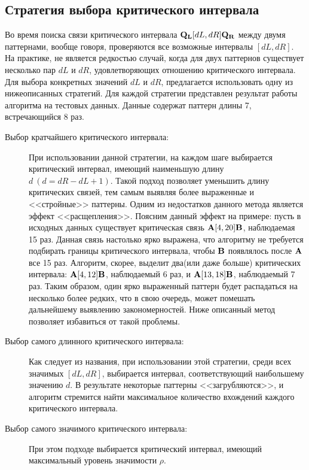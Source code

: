 \subsection{Стратегия выбора критического интервала}
Во время поиска связи критического интервала ${\bf Q_L}[dL,dR]{\bf Q_R}$  между двумя паттернами, вообще говоря, проверяются все возможные интервалы $[dL, dR]$.
На практике, не является редкостью случай, когда для двух паттернов существует несколько пар $dL$ и $dR$, удовлетворяющих отношению
критического интервала. Для выбора конкретных значений $dL$ и  $dR$, предлагается использовать одну из нижеописанных стратегий. Для каждой стратегии 
представлен результат работы алгоритма на тестовых данных. Данные содержат паттерн длины 7, встречающийся 8 раз. 
\begin{description}
\item[Выбор кратчайшего критического интервала:]

При использовании данной стратегии, на каждом шаге выбирается критический интервал, имеющий наименьшую длину $d~(d=dR-dL+1)$.
Такой подход позволяет уменьшить длину критических связей, тем самым выявляя более выраженные и <<стройные>> паттерны. Одним из недостатков данного метода
является эффект <<расщепления>>. Поясним данный эффект на примере: пусть в исходных данных существует критическая связь ${\bf A}[4,20]{\bf B}$, наблюдаемая 15 раз. Данная связь настолько ярко выражена, что алгоритму не требуется подбирать границы критического интервала, чтобы ${\bf B}$ появлялось
после ${\bf A}$ все 15 раз. Алгоритм, скорее, выделит два(или даже больше) критических интервала: ${\bf A}[4,12]{\bf B}$, наблюдаемый 6 раз, и 
${\bf A}[13,18]{\bf B}$, наблюдаемый 7 раз. Таким образом, один ярко выраженный паттерн будет распадаться на несколько более редких, что в свою очередь, может 
помешать дальнейшему выявлению закономерностей. Ниже описанный метод позволяет избавиться от такой проблемы.      
\item[Выбор самого длинного критического интервала:]

Как следует из названия, при использовании этой стратегии, среди всех значимых $[dL,dR]$, выбирается интервал, соответствующий наибольшему
значению $d$. В результате некоторые паттерны <<загрубляются>>, и алгоритм стремится найти максимальное количество вхождений каждого критического интервала. 

\item[Выбор самого значимого критического интервала:]

При этом подходе выбирается критический интервал, имеющий максимальный уровень значимости $\rho$.
\end{description}

